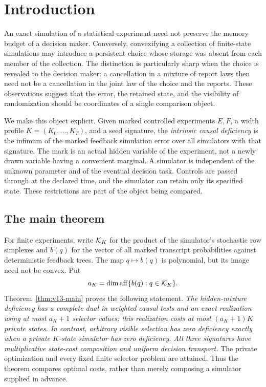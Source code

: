 \section{Introduction}\label{sec:v13-intro}
An exact simulation of a statistical experiment need not preserve the
memory budget of a decision maker. Conversely, convexifying a collection
of finite-state simulations may introduce a persistent choice whose
storage was absent from each member of the collection. The distinction
is particularly sharp when the choice is revealed to the decision maker:
a cancellation in a mixture of report laws then need not be a cancellation
in the joint law of the choice and the reports. These observations suggest
that the error, the retained state, and the visibility of randomization
should be coordinates of a single comparison object.

We make this object explicit. Given marked controlled experiments
$E,F$, a width profile $K=(K_0,\ldots,K_T)$, and a seed signature, the
\emph{intrinsic causal deficiency} is the infimum of the marked feedback
simulation error over all simulators with that signature. The mark is
an actual hidden variable of the experiment, not a newly drawn variable
having a convenient marginal. A simulator is independent of the unknown
parameter and of the eventual decision task. Controls are passed through
at the declared time, and the simulator can retain only its specified
state. These restrictions are part of the object being compared.

\subsection{The main theorem}
For finite experiments, write $\mathcal K_K$ for the product of the simulator's
stochastic row simplexes and $b(q)$ for the vector of all marked transcript
probabilities against deterministic feedback trees. The map $q\mapsto
b(q)$ is polynomial, but its image need not be convex. Put
\[
 a_K=\dim\operatorname{aff}\{b(q):q\in\mathcal K_K\}.
\]
Theorem~\ref{thm:v13-main} proves the following statement.
\emph{The hidden-mixture deficiency has a complete dual in weighted causal
tests and an exact realization using at most $a_K+1$ selector values;
this realization costs at most $(a_K+1)K$ private states. In contrast,
arbitrary visible selection has zero deficiency exactly when a private
$K$-state simulator has zero deficiency. All three signatures have
multiplicative state-cost composition and uniform decision transport.}
The private optimization and every fixed finite selector problem are
attained. Thus the theorem compares optimal costs, rather than merely
composing a simulator supplied in advance.

